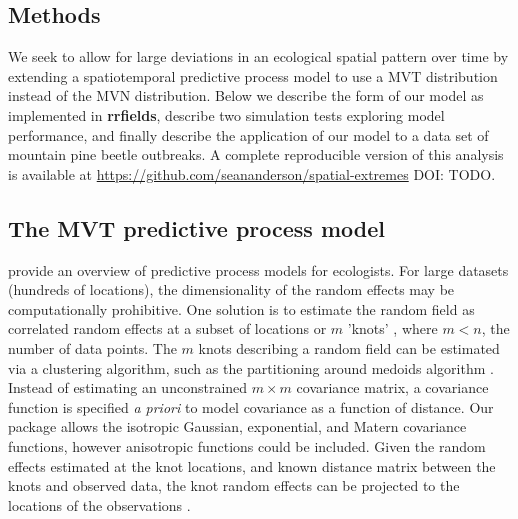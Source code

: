 \documentclass[12pt,english]{article}
\begin{document}
\begin{spacing}{1.9}
\section{Methods}

We seek to allow for large deviations in an ecological spatial pattern over
time by extending a spatiotemporal predictive process model to use a MVT
distribution instead of the MVN distribution. Below we describe the form of
our model as implemented in \textbf{rrfields}, describe two simulation tests
exploring model performance, and finally describe the application of our model
to a data set of mountain pine beetle outbreaks.
A complete reproducible version of this analysis is available at
\url{https://github.com/seananderson/spatial-extremes} DOI: TODO.

\subsection{The MVT predictive process model}

\citet{latimer2009} provide an overview of predictive process models for
ecologists. For large datasets (hundreds of locations), the dimensionality of the random
effects may be computationally prohibitive. One solution is to estimate the random
field as correlated random effects at a subset of locations or $m$ 'knots'
\citep[e.g.][]{latimer2009, shelton2014}, where $m < n$, the number of data points. The
$m$ knots describing a random field can be estimated via a clustering algorithm,
such as the partitioning around medoids
algorithm \citep[the \texttt{pam} function in the R package
\textbf{cluster};][]{reynolds2006}.
Instead of estimating an unconstrained $m \times m$ covariance matrix, a covariance
function is specified \emph{a priori} to model covariance as a function of distance.
Our package allows the isotropic Gaussian, exponential, and Matern covariance functions,
however anisotropic functions could be included. Given the random
effects estimated at the knot locations, and known distance matrix between the knots
and observed data, the knot random effects can be projected to the locations of the
observations \citep[][Figure~\ref{fig:didactic}]{latimer2009, finley2009}.


\end{spacing}
\end{document}
